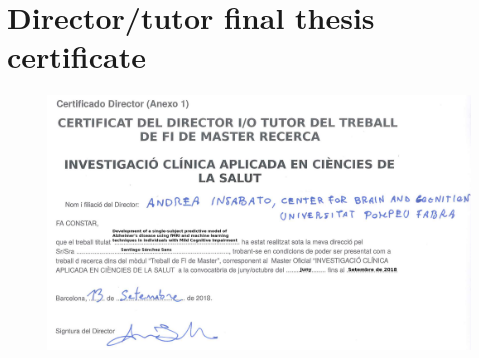 


%


%



\section{Director/tutor final thesis certificate} \label{director}

\FloatBarrier
\begin{figure}[h]
	\centering
	\includegraphics[width=1\textwidth]{fig_certificat_tutoridirector.png}
	\label{fig:tutordirector}
\end{figure}
\FloatBarrier
\clearpage





